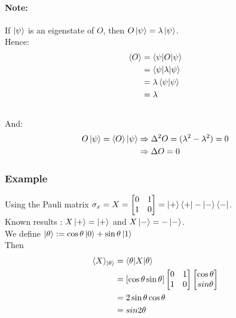 \documentclass{article}
\begin{document}
\paragraph{Note:} If $\ket{\psi}$ is an eigenstate of $O$, then $O\ket{\psi} = \lambda \ket{\psi}$.
\\
Hence:
\begin{equation}
    \begin{aligned}
        \braket{O}
            & = \braket{\psi | O | \psi} \\
            & = \braket{\psi | \lambda | \psi} \\
            & = \lambda\braket{\psi|\psi } \\
            & = \lambda
    \end{aligned}
\end{equation}
\\
And:
\begin{equation}
    \begin{aligned}
        O\ket{\psi} = \braket{O} \ket{\psi}
            & \Rightarrow \Delta^2 O = (\lambda^2 - \lambda^2) = 0 \\
            & \Rightarrow \Delta O = 0
    \end{aligned}
\end{equation}

\subsubsection*{Example}
Using the Pauli matrix $\sigma_x = X =
    \begin{bmatrix}
    0 & 1 \\
    1 & 0
    \end{bmatrix}
    = \ket{+}\bra{+} - \ket{-}\bra{-}
    $.
\\\noindent
Known results : $X\ket{+} = \ket{+}$ and $X\ket{-}=-\ket{-}$.
\\\noindent
We define $\ket{\theta}:=\cos\theta\ket{0}+\sin\theta\ket{1}$
\\\noindent
Then
\begin{equation}
    \begin{aligned}
        \langle X \rangle_{\ket{\theta}}
            & = \braket{\theta | X |\theta} \\
            & = [\cos \theta \sin \theta]
                \begin{bmatrix}0 & 1 \\ 1 & 0 \end{bmatrix}
                \begin{bmatrix} \cos \theta\\ sin \theta \end{bmatrix} \\
            & = 2 \sin\theta\cos\theta \\
            & = sin 2\theta
    \end{aligned}
\end{equation}
\end{document}
